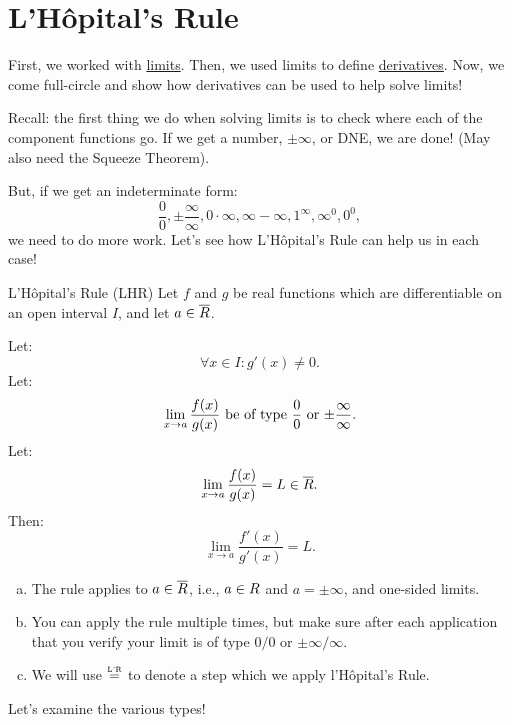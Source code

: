 \section{L'Hôpital's Rule}
First, we worked with \underline{limits}. Then, we used limits to define \underline{derivatives}. Now,
we come full-circle and show how derivatives can be used to help solve limits!

Recall: the first thing we do when solving limits is to check where each of the component functions go. If
we get a number, $ \pm \infty $, or DNE, we are done! (May also need the Squeeze Theorem).

But, if we get an indeterminate form:
\[ \frac{0}{0},\pm \frac{\infty}{\infty},0\cdot \infty,\infty-\infty,1^{\infty},\infty^0,0^0, \]
we need to do more work. Let's see how L'Hôpital's Rule can help us in each case!
\begin{Theorem}{L'Hôpital's Rule (LHR)}{}
    Let $ f $ and $ g $ be real functions which are differentiable on an open interval $ I $, and let $ a\in\overline{\relax{R}} $.

    Let:
    \[ \forall x\in I:g'(x)\ne 0. \]
    Let:
    \[ \lim\limits_{{x} \to {a}}\frac{f(x)}{g(x)}\text{ be of type $\frac{0}{0}$ or $ \pm \frac{\infty}{\infty} $}. \]
    Let:
    \[ \lim\limits_{{x} \to {a}}\frac{f(x)}{g(x)}=L\in\overline{\relax{R}}. \]
    Then:
    \[ \lim\limits_{{x} \to {a}}\frac{f'(x)}{g'(x)}=L. \]
\end{Theorem}
\begin{Remark}{}{}
    \begin{enumerate}[(a)]
        \item The rule applies to $ a\in\overline{\relax{R}} $, i.e., $ a\in\relax{R} $ and $ a=\pm\infty $, and one-sided limits.
        \item You can apply the rule multiple times, but make sure after each application that you verify your limit is of type $ 0/0 $
              or $ \pm\infty/\infty $.
        \item We will use $ \stackrel{\text{\tiny L'R}}{=} $ to denote a step which we apply l'Hôpital's Rule.
    \end{enumerate}
\end{Remark}
Let's examine the various types!
